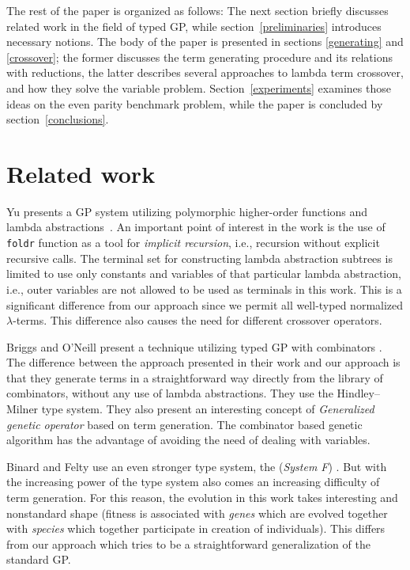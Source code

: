 \documentclass{sig-alternate}
\newcommand{\lterms}{$\lambda$-terms\xspace}
\newcommand{\red}[1]{{\color{red} #1}}
\begin{document}


The rest of the paper is organized as follows: The next section briefly discusses related work in the field of typed GP, while section~\ref{preliminaries} introduces necessary notions.
The body of the paper is presented in sections \ref{generating} and \ref{crossover}; the former discusses the term generating 
procedure and its relations
with reductions, the latter describes several approaches to lambda term
crossover, and how they solve the variable problem. Section~\ref{experiments} examines those ideas on the even parity benchmark problem, while the paper is concluded by section~\ref{conclusions}.

\vfill

\section{Related work}
\label{related}

Yu presents a GP system utilizing
polymorphic higher-order functions
and lambda abstractions~\cite{yu01}.
An important point of interest in the work is the use of
\texttt{foldr} function as a tool for \textit{implicit recursion}, i.e., recursion without explicit recursive calls. The terminal set for constructing lambda abstraction subtrees  is limited to use only constants and variables of that particular lambda abstraction, i.e., outer variables are not allowed to be used as terminals in this work. This is a significant difference from our approach since we permit all well-typed normalized \lterms. This difference also causes the need for different crossover operators.  

Briggs and O’Neill present a technique 
utilizing typed GP with combinators \cite{kes}.
The difference between the approach presented in their work
and our approach is that they generate terms in a straightforward way directly from the library of combinators, without any use of lambda abstractions. They use the Hindley–Milner type system. They also present an interesting concept of \textit{Generalized genetic operator} based on term generation. The combinator based genetic algorithm has the advantage of avoiding the need of dealing with variables.

Binard and Felty use an even stronger type system, the (\textit{System F}) \cite{binard2008genetic}. But with the increasing power of the type system also comes an increasing difficulty of term generation. For this reason, the evolution in this work takes interesting and nonstandard shape (fitness is associated with \textit{genes} which are evolved together with \textit{species} which together participate in creation of individuals). This differs from our approach which tries to be a straightforward generalization of the standard GP\cite{koza92}.
\end{document}
